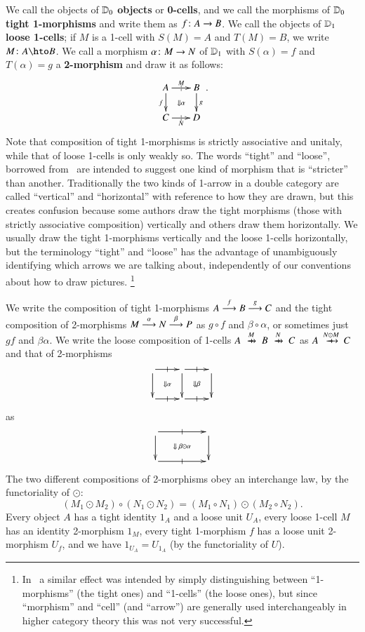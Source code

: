 We call the objects of $\lD_0$ \textbf{objects} or \textbf{0-cells},
and we call the morphisms of $\lD_0$ \textbf{tight 1-morphisms}
and write them as $f\maps A\to B$.  We call the objects of $\lD_1$
\textbf{loose 1-cells}; if $M$ is a 1-cell with $S(M)=A$ and
$T(M)=B$, we write $M\maps A\hto B$.  We call a morphism $\alpha\maps
M\to N$ of $\lD_1$ with $S(\alpha)=f$ and $T(\alpha)=g$ a
\textbf{2-morphism} and draw it as follows:
\begin{equation}\label{eq:square}
  \xymatrix@-.5pc{
    A \ar[r]|{|}^{M}  \ar[d]_f \ar@{}[dr]|{\Downarrow\alpha}&
    B\ar[d]^g\\
    C \ar[r]|{|}_N & D
  }.
\end{equation}
Note that composition of tight 1-morphisms is strictly associative and unitaly, while that of loose 1-cells is only weakly so.
The words ``tight'' and ``loose'', borrowed from~\cite{ls:limlax} are intended to suggest one kind of morphism that is ``stricter'' than another.
Traditionally the two kinds of 1-arrow in a double category are called ``vertical'' and ``horizontal'' with reference to how they are drawn, but this creates confusion because some authors draw the tight morphisms (those with strictly associative composition) vertically and others draw them horizontally.
We usually draw the tight 1-morphisms vertically and the loose 1-cells horizontally, but the terminology ``tight'' and ``loose'' has the advantage of unambiguously identifying which arrows we are talking about, independently of our conventions about how to draw pictures.%
\footnote{In~\cite{shulman:smbicat} a similar effect was intended by simply distinguishing between ``1-morphisms'' (the tight ones) and ``1-cells'' (the loose ones), but since ``morphism'' and ``cell'' (and ``arrow'') are generally used interchangeably in higher category theory this was not very successful.}

We write the composition of tight 1-morphisms $A\too[f] B\too[g] C$
and the tight composition of 2-morphisms $M\too[\alpha]
N\too[\beta] P$ as $g\circ f$ and $\beta\circ\alpha$, or sometimes
just $gf$ and $\beta\alpha$.  We write the loose composition of
1-cells $A\xhto{M} B \xhto{N} C$ as $A\xhto{N\odot M} C$ and that of
2-morphisms
\[\vcenter{\xymatrix{ \ar[r]|-@{|}^-{} \ar[d] \ar@{}[dr]|{\Downarrow\alpha} &
     \ar[r]|-@{|}^-{} \ar[d] \ar@{}[dr]|{\Downarrow\beta} &\ar[d]\\
  \ar[r]|-@{|}_-{} & \ar[r]|-@{|}_-{} & }}\]
as
\[\vcenter{\xymatrix@C=4pc{ \ar[r]|-@{|}^-{} \ar[d] \ar@{}[dr]|{\Downarrow\;\be\odot\al} &  \ar[d]\\
  \ar[r]|-@{|}_-{} & }}\]
The two different compositions of 2-morphisms obey an interchange law,
by the functoriality of $\odot$:
\[(M_1\odot M_2) \circ (N_1\odot N_2) = (M_1\circ N_1)\odot (M_2\circ N_2).
\]
Every object $A$ has a tight identity $1_A$ and a loose unit
$U_A$, every loose 1-cell $M$ has an identity 2-morphism $1_M$, every
tight 1-morphism $f$ has a loose unit 2-morphism $U_f$, and we
have $1_{U_A} = U_{1_A}$ (by the functoriality of $U$).

